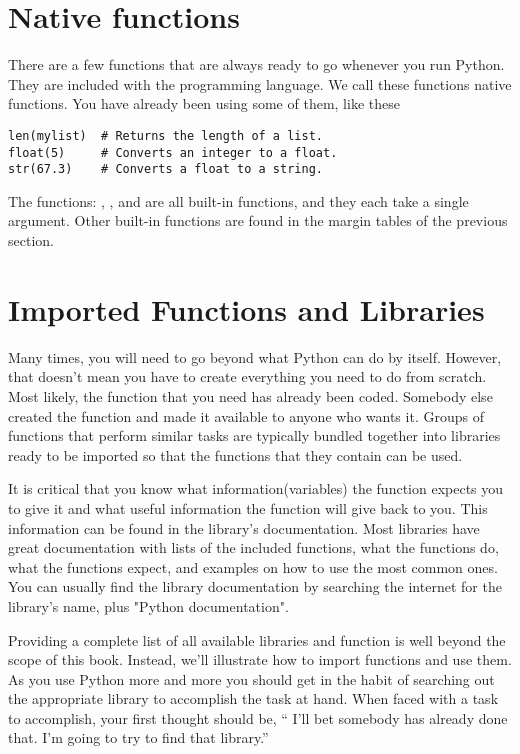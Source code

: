 \section{Native functions}
There are a few functions that are always ready to go whenever you run Python. They are included with the
programming language.  We call these functions native
functions.  You have already been using some
of them, like these
\begin{Verbatim}
len(mylist)  # Returns the length of a list.
float(5)     # Converts an integer to a float.
str(67.3)    # Converts a float to a string.
\end{Verbatim}
The functions: , , and  are all
built-in functions, and they each take a single argument.  Other
built-in functions are found in the margin tables of the previous section.






\section{Imported Functions and Libraries}
Many times, you will need to go beyond what Python can do by itself. However, that doesn't mean you have to create everything you need to do from scratch.  Most likely, the function that you need has already been coded. Somebody
else created the function and made it available to anyone
who wants it.  Groups of functions that perform similar tasks are
typically bundled together into libraries ready to be imported so that the functions that they contain can be used.

It is critical that you know what information(variables) the function expects you to give it and what
useful information the function will give back to you.  This
information can be found in the library's documentation. Most libraries have great documentation with lists of the included functions, what the functions do, what the functions expect, and examples on how to use the most common ones.  You can usually find the library documentation by searching the internet for the library's name, plus "Python documentation".

Providing a complete list of all available libraries and function is well beyond
the scope of this book. Instead, we'll illustrate how to import
functions and use them.  As you use Python more and more you
should get in the habit of searching out the appropriate library to
accomplish the task at hand. When faced with a task to accomplish,
your first thought should be, `` I'll bet somebody has already done that.
I'm going to try to find that library.''



